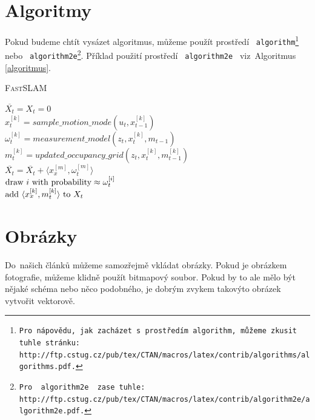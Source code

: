 \documentclass[a4paper, 11pt]{article}
\begin{document}
\section{Algoritmy} \label{algoritmy}
Pokud budeme chtít vysázet algoritmus, můžeme použít prostředí \texttt{ algorithm\footnote{Pro~nápovědu, jak zacházet s~prostředím \texttt{algorithm}, můžeme zkusit tuhle stránku:\\http://ftp.cstug.cz/pub/tex/CTAN/macros/latex/contrib/algorithms/algorithms.pdf.} } nebo \texttt{ algorithm2e\footnote{Pro~\texttt{ algorithm2e } zase tuhle:
http://ftp.cstug.cz/pub/tex/CTAN/macros/latex/contrib/algorithm2e/algorithm2e.pdf.}}. Příklad použití prostředí \texttt{ algorithm2e } viz~Algoritmus \ref{algoritmus}.
\bigskip
\begin{algorithm}[h]
\SetAlgoNoLine
\SetNlSkip{-1.20em}
\caption{\textsc{Fast}SLAM} \label{algoritmus}
\SetNlSty{}{}{:}
\SetInd{1em}{1em}
\BlankLine
\Indp \Indp
$\overline{X_t} = X_t = 0$\\
{$x^{[k]}_{t} = sample\_motion\_mode(u_t ,x^{[k]}_{t-1})$\\
$\omega^{[k]}_{t} = measurement\_model(z_t ,x^{[k]}_{t}, m_{t-1})$\\
$m^{[k]}_{t} = updated\_occupancy\_grid(z_t ,x^{[k]}_{t}, m_{t-1}^{[k]})$\\
$\overline{X_t} = \overline{X_t} + \langle x^{[m]}_{x}, \omega^{[m]}_{t} \rangle$\\}
{$\textnormal{draw } i \textnormal{ with probability} \approx \omega^{[i]}_{t}$\\
$\textnormal{add } \langle x^{[k]}_{x}, m^{[k]}_{t} \rangle \textnormal{ to } X_t$\\}
\end{algorithm}

\section{Obrázky}
Do~našich článků můžeme samozřejmě vkládat obrázky. Pokud je obrázkem fotografie,
můžeme klidně použít bitmapový soubor. Pokud by to ale mělo být nějaké schéma nebo
něco podobného, je dobrým zvykem takovýto obrázek vytvořit vektorově.
\end{document}

